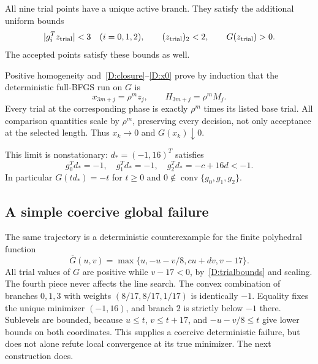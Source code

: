 All nine trial points have a unique active branch. They satisfy the additional uniform bounds
\begin{equation}\label{D:trialbounds}
 |g_i^Tz_{\rm trial}|<3\quad(i=0,1,2),
 \qquad (z_{\rm trial})_2<2,
 \qquad G(z_{\rm trial})>0.
\end{equation}
The accepted points satisfy these bounds as well.

Positive homogeneity and~\eqref{D:closure}--\eqref{D:x0} prove by induction that the deterministic full-BFGS run on $G$ is
\[
 x_{3m+j}=\rho^m z_j,\qquad H_{3m+j}=\rho^m M_j.
\]
Every trial at the corresponding phase is exactly $\rho^m$ times its listed base trial. All comparison quantities scale by $\rho^m$, preserving every decision, not only acceptance at the selected length. Thus $x_k\to0$ and $G(x_k)\downarrow0$.

This limit is nonstationary: $d_* =(-1,16)^T$ satisfies
\[
 g_0^Td_*=-1,\quad g_1^Td_*=-1,\quad g_2^Td_*=-c+16d<-1.
\]
In particular $G(td_*)=-t$ for $t\ge0$ and $0\notin\operatorname{conv}\{g_0,g_1,g_2\}$.



\subsection{A simple coercive global failure}
The same trajectory is a deterministic counterexample for the finite polyhedral function
\[
 \overline G(u,v)=\max\{u,-u-v/8,cu+dv,v-17\}.
\]
All trial values of $G$ are positive while $v-17<0$, by~\eqref{D:trialbounds} and scaling. The fourth piece never affects the line search. The convex combination of branches $0,1,3$ with weights $(8/17,8/17,1/17)$ is identically $-1$. Equality fixes the unique minimizer $(-1,16)$, and branch $2$ is strictly below $-1$ there. Sublevels are bounded, because $u\le t$, $v\le t+17$, and $-u-v/8\le t$ give lower bounds on both coordinates. This supplies a coercive deterministic failure, but does not alone refute local convergence at its true minimizer. The next construction does.


\setcounter{section}{3}
\setcounter{theorem}{1}
\setcounter{lemma}{1}
\setcounter{corollary}{0}
\setcounter{proposition}{0}
\setcounter{remark}{0}
\setcounter{equation}{7}


